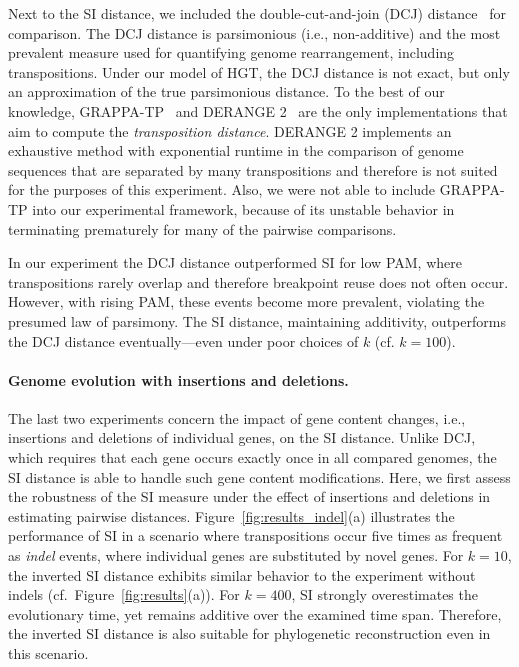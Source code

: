 \documentclass[9pt,english,utf8]{article}
\begin{document}
Next to the SI distance, we included the double-cut-and-join (DCJ)
distance~\cite{Yancopoulos:2005bm,Bergeron:2006uj} for comparison. The DCJ
distance is parsimonious (i.e., non-additive) and the most prevalent measure
used for quantifying genome rearrangement, including transpositions. Under our
model of HGT, the DCJ distance is not exact, but only an approximation of the
true parsimonious distance. To the best of our knowledge,
GRAPPA-TP~\cite{Yue:2008ima} and DERANGE 2~\cite{Blanchette:1996wx} are the
only implementations that aim to compute the \emph{transposition distance}.
DERANGE 2 implements an exhaustive method with exponential runtime in the
comparison of genome sequences that are separated by many transpositions and
therefore is not suited for the purposes of this experiment. Also, we were not
able to include GRAPPA-TP into our experimental framework, because of its
unstable behavior in terminating prematurely for many of the pairwise
comparisons.

In our experiment the DCJ distance outperformed SI for low PAM, where
transpositions rarely overlap and therefore breakpoint reuse does not often
occur. However, with rising PAM, these events become more prevalent, violating
the presumed law of parsimony.  The SI distance, maintaining additivity,
outperforms the DCJ distance eventually---even under poor choices of $k$ (cf.
$k=100$).

\paragraph{Genome evolution with insertions and deletions.} The last two
experiments concern the impact of gene content changes, i.e., insertions and
deletions of individual genes, on the SI distance. Unlike DCJ, which requires
that each gene occurs exactly once in all compared genomes, the SI distance is
able to handle such gene content modifications.  Here, we first assess the
robustness of the SI measure under the effect of insertions and deletions in
estimating pairwise distances. Figure~\ref{fig:results_indel}(a) illustrates
the performance of SI in a scenario where transpositions occur five times as
frequent as \emph{indel} events, where individual genes are substituted by
novel genes. For $k=10$, the inverted SI distance exhibits similar behavior to
the experiment without indels (cf.~Figure~\ref{fig:results}(a)).  For $k=400$,
SI strongly overestimates the evolutionary time, yet remains additive over the
examined time span.  Therefore, the inverted SI distance is also suitable for
phylogenetic reconstruction even in this scenario.
\end{document}
